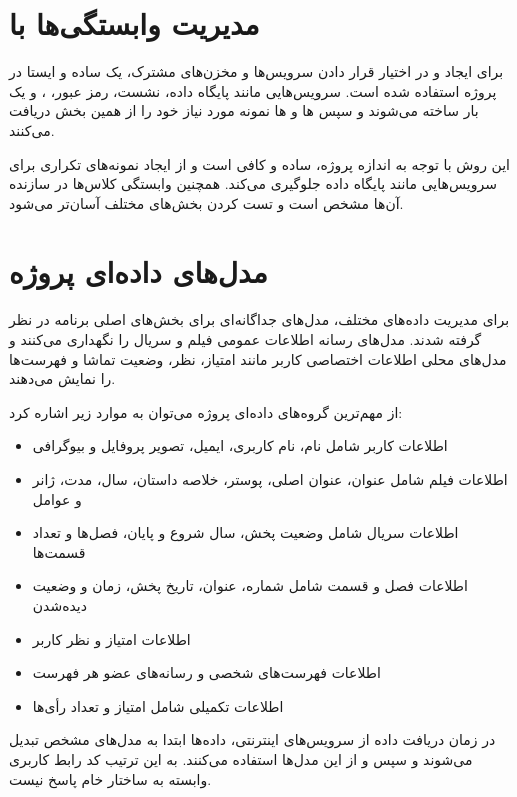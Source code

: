 \documentclass[a4paper,14pt]{extarticle}
\begin{document}
\section*{مدیریت وابستگی‌ها با }

برای ایجاد و در اختیار قرار دادن سرویس‌ها و مخزن‌های مشترک، یک  ساده و ایستا در پروژه استفاده شده است. سرویس‌هایی مانند پایگاه داده، نشست، رمز عبور، ،  و  یک بار ساخته می‌شوند و سپس ها و ها نمونه مورد نیاز خود را از همین بخش دریافت می‌کنند.

این روش با توجه به اندازه پروژه، ساده و کافی است و از ایجاد نمونه‌های تکراری برای سرویس‌هایی مانند پایگاه داده جلوگیری می‌کند. همچنین وابستگی کلاس‌ها در سازنده آن‌ها مشخص است و تست کردن بخش‌های مختلف آسان‌تر می‌شود.

\section*{مدل‌های داده‌ای پروژه}

برای مدیریت داده‌های مختلف، مدل‌های جداگانه‌ای برای بخش‌های اصلی برنامه در نظر گرفته شدند. مدل‌های رسانه اطلاعات عمومی فیلم و سریال را نگهداری می‌کنند و مدل‌های محلی اطلاعات اختصاصی کاربر مانند امتیاز، نظر، وضعیت تماشا و فهرست‌ها را نمایش می‌دهند.

از مهم‌ترین گروه‌های داده‌ای پروژه می‌توان به موارد زیر اشاره کرد:

\begin{itemize}
    \item اطلاعات کاربر شامل نام، نام کاربری، ایمیل، تصویر پروفایل و بیوگرافی
    \item اطلاعات فیلم شامل عنوان، عنوان اصلی، پوستر، خلاصه داستان، سال، مدت، ژانر و عوامل
    \item اطلاعات سریال شامل وضعیت پخش، سال شروع و پایان، فصل‌ها و تعداد قسمت‌ها
    \item اطلاعات فصل و قسمت شامل شماره، عنوان، تاریخ پخش، زمان و وضعیت دیده‌شدن
    \item اطلاعات امتیاز و نظر کاربر
    \item اطلاعات فهرست‌های شخصی و رسانه‌های عضو هر فهرست
    \item اطلاعات تکمیلی  شامل امتیاز و تعداد رأی‌ها
\end{itemize}

در زمان دریافت داده از سرویس‌های اینترنتی، داده‌ها ابتدا به مدل‌های مشخص تبدیل می‌شوند و سپس  و  از این مدل‌ها استفاده می‌کنند. به این ترتیب کد رابط کاربری وابسته به ساختار خام پاسخ  نیست.
\end{document}
